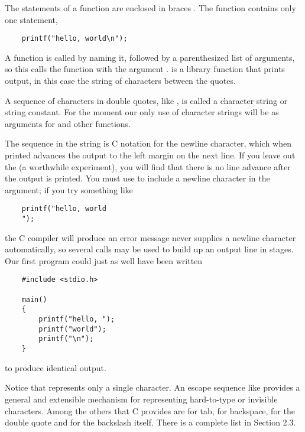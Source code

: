 The statements of a function are enclosed in braces \code{{}}. The function  contains only one statement,
\begin{lstlisting}
	printf("hello, world\n");
\end{lstlisting}
A function is called by naming it, followed by a parenthesized list of arguments, so this calls the function  with the argument .
 is a library function that prints output, in this case the string of characters between the quotes.

A sequence of characters in double quotes, like , is called a character string or string constant.
For the moment our only use of character strings will be as arguments for  and other functions.

The sequence  in the string is C notation for the newline character, which when printed advances the output to the left margin on the next line.
If you leave out the  (a worthwhile experiment), you will find that there is no line advance after the output is printed.
You must use  to include a newline character in the  argument; if you try something like
\begin{lstlisting}
	printf("hello, world
	");
\end{lstlisting}
the C compiler will produce an error message
 never supplies a newline character automatically, so several calls may be used to build up an output line in stages.
Our first program could just as well have been written

\begin{lstlisting}
	#include <stdio.h>

	main()
	{
		printf("hello, ");
		printf("world");
		printf("\n");
	}
\end{lstlisting}

to produce identical output.

Notice that  represents only a single character.
An escape sequence like  provides a general and extensible mechanism for representing hard-to-type or invisible characters.
Among the others that C provides are  for tab,  for backspace,  for the double quote and \code{\textbackslash\textbackslash} for the backslash itself.
There is a complete list in Section 2.3.
\newline

